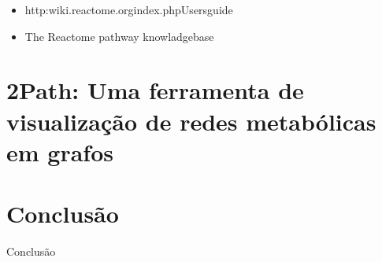 \documentclass[conference]{IEEEtran}
\begin{document}
\begin{itemize}
\item http:\/\/wiki.reactome.org\/index.php\/Usersguide
\item The Reactome pathway knowladgebase
\end{itemize}



\section{2Path: Uma ferramenta de visualização de redes metabólicas em grafos}

\section{Conclusão}

Conclusão





%
%
\end{document}
